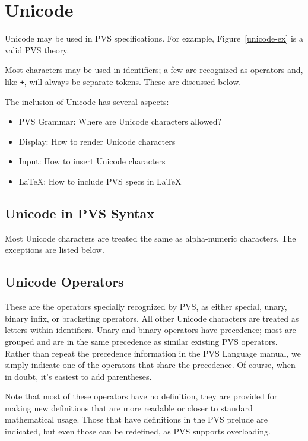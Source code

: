 \chapter{Unicode}
\label{unicode}

Unicode may be used in PVS specifications.  For example,
Figure~\ref{unicode-ex} is a valid PVS theory.


Most characters may be used in identifiers; a few are recognized as
operators and, like \texttt{+}, will always be separate tokens.  These are
discussed below.

The inclusion of Unicode has several aspects:
\begin{itemize}
\item PVS Grammar: Where are Unicode characters allowed?
\item Display: How to render Unicode characters
\item Input: How to insert Unicode characters
\item LaTeX: How to include PVS specs in LaTeX
\end{itemize}

\section{Unicode in PVS Syntax}

Most Unicode characters are treated the same as alpha-numeric characters.
The exceptions are listed below.

\section{Unicode Operators}

These are the operators specially recognized by PVS, as either special,
unary, binary infix, or bracketing operators.  All other Unicode
characters are treated as letters within identifiers.  Unary and binary
operators have precedence; most are grouped and are in the same precedence
as similar existing PVS operators.  Rather than repeat the precedence
information in the PVS Language manual, we simply indicate one of the
operators that share the precedence.  Of course, when in doubt, it's
easiest to add parentheses.

Note that most of these operators have no definition, they are provided
for making new definitions that are more readable or closer to standard
mathematical usage.  Those that have definitions in the PVS prelude are
indicated, but even those can be redefined, as PVS supports overloading.

